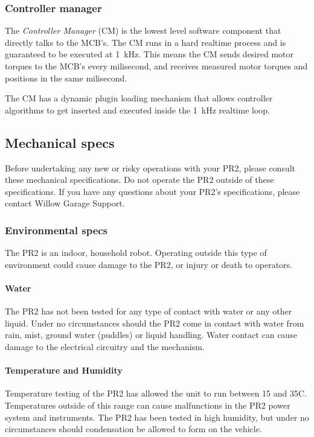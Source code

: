 \subsubsection{Controller manager}
The \emph{Controller Manager} (CM) is the lowest level software
component that directly talks to the MCB's. The CM runs in a hard
realtime process and is guaranteed to be executed at 1~kHz. This means
the CM sends desired motor torques to the MCB's every milisecond, and
receives measured motor torques and positions in the same milisecond.

The CM has a dynamic plugin loading mechanism that allows controller
algorithms to get inserted and executed inside the 1~kHz realtime
loop.


\subsection{Mechanical specs}

Before undertaking any new or risky operations with your PR2, please consult these mechanical specifications. Do not operate the PR2 outside of these specifications. If you have any questions about your PR2's specifications, please contact Willow Garage Support.

\subsubsection{Environmental specs}

The PR2 is an indoor, household robot. Operating outside this type of environment could cause damage to the PR2, or injury or death to operators.

\paragraph{Water}

The PR2 has not been tested for any type of contact with water or any other liquid. Under no circumstances should the PR2 come in contact with water from rain, mist, ground water (puddles) or liquid handling. Water contact can cause damage to the electrical circuitry and the mechanism.

\paragraph{Temperature and Humidity}

Temperature testing of the PR2 has allowed the unit to run between 15 and 35C. Temperatures outside of this range can cause malfunctions in the PR2 power system and instruments. The PR2 has been tested in high humidity, but under no circumstances should condensation be allowed to form on the vehicle.

